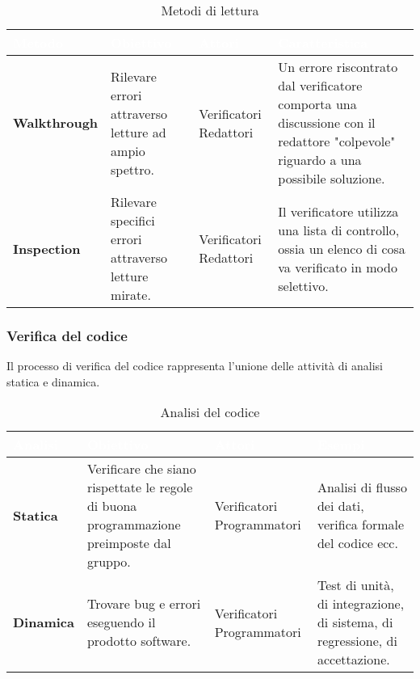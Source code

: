 \renewcommand{\arraystretch}{1.5}
\renewcommand\extrarowheight{1.5pt}
\begin{longtable}{C{3cm} | C{4cm} C{4cm} C{5cm}}
		\caption{Metodi di lettura} \\
		\textcolor{white}{\textbf{Metodo}} & 
		\textcolor{white}{\textbf{Obiettivo}} & 
		\textcolor{white}{\textbf{Attori}} & 
		\textcolor{white}{\textbf{Caratteristica}} \\
		\endfirsthead
		\hline
		\textbf{Walkthrough} & 
		Rilevare errori attraverso letture ad ampio spettro. & 
		Verificatori \newline Redattori & 
		Un errore riscontrato dal verificatore comporta una discussione con il redattore "colpevole" riguardo a una possibile soluzione. \\
		\hline
		\textbf{Inspection} & 
		Rilevare specifici errori attraverso letture mirate. & 
		Verificatori \newline Redattori & 
		Il verificatore utilizza una lista di controllo, ossia un elenco di cosa va verificato in modo selettivo. \\
\end{longtable}

\subsubsection{Verifica del codice}
Il processo di verifica del codice rappresenta l'unione delle attività di analisi statica e dinamica. 

\renewcommand{\arraystretch}{1.5}
\renewcommand\extrarowheight{1.5pt}
\begin{longtable}{C{3cm} | C{4cm} C{4cm} C{5cm}}
		\caption{Analisi del codice} \\
		\textcolor{white}{\textbf{Analisi}} & 
		\textcolor{white}{\textbf{Obiettivo}} & 
		\textcolor{white}{\textbf{Attori}} & 
		\textcolor{white}{\textbf{Esempi}} \\
		\endfirsthead
		\hline
		\textbf{Statica} & 
		Verificare che siano rispettate le regole di buona programmazione preimposte dal gruppo. & 
		Verificatori \newline Programmatori & 
		Analisi di flusso dei dati, verifica formale del codice ecc. \\
		\hline
		\textbf{Dinamica} & 
		Trovare bug e errori eseguendo il prodotto software.  & 
		Verificatori \newline Programmatori & 
		Test di unità, di integrazione, di sistema, di regressione, di accettazione. \\
\end{longtable}


